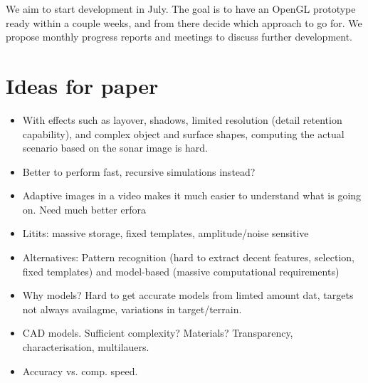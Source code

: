 \documentclass[
   article                                      %
 , 12pt                                         %
 , xelatex                                      %
 , bibtex                                       %
 , layout
]{common/mytemplate}
\begin{document}
We aim to start development in July. The goal is to have an OpenGL prototype ready within a couple weeks, and from there decide which approach to go for. We propose monthly progress reports and meetings to discuss further 
development.





\newpage

\section{Ideas for paper}

\begin{itemize}
\item With effects such as layover, shadows, limited resolution (detail retention capability), and complex object and surface shapes, computing the actual scenario based on the sonar image is hard.
\item Better to perform fast, recursive simulations instead?
\item Adaptive images in a video makes it much easier to understand what is going on. Need much better erfora
\item Litits: massive storage, fixed templates, amplitude/noise sensitive
\item Alternatives: Pattern recognition (hard to extract decent features, selection, fixed templates) and model-based (massive computational requirements)
\item Why models? Hard to get accurate models from limted amount dat, targets not always availagme, variations in target/terrain.
\item CAD models. Sufficient complexity? Materials? Transparency, characterisation, multilauers.
\item Accuracy vs. comp. speed.
\end{itemize}

\newpage


% 
\end{document}
